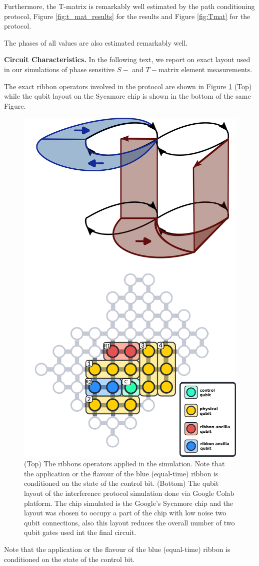 \documentclass[two column]{article}
\begin{document}
Furthermore, the T-matrix is remarkably well estimated by the path conditioning protocol, Figure \ref{fig:t_mat_results} for the results and Figure \ref{fig:Tmat} for the protocol.

The phases of all values are also estimated remarkably well.

\textbf{Circuit Characteristics.}
In the following text, we report on exact layout used in our simulations of phase sensitive $S-$ and $T-$matrix element measurements.

The exact ribbon operators involved in the protocol are shown in Figure \ref{fig:intef_setup} (Top) while the qubit layout on the Sycamore chip is shown in the bottom of the same Figure.
\begin{figure}
	\centering
	\includegraphics[width=0.75\linewidth]{Figures/intef_setup.pdf}
	\caption{(Top) The ribbons operators applied in the simulation. Note that the application or the flavour of the blue (equal-time) ribbon is conditioned on the state of the control bit.  (Bottom) The qubit layout of the interference protocol simulation done via Google Colab platform. The chip simulated is the Google's Sycamore chip and the layout was chosen to occupy a part of the chip with low noise two qubit connections, also this layout reduces the overall number of two qubit gates used int the final circuit.}
	\label{fig:intef_setup}
\end{figure}
Note that the application or the flavour of the blue (equal-time) ribbon is conditioned on the state of the control bit.
\end{document}
